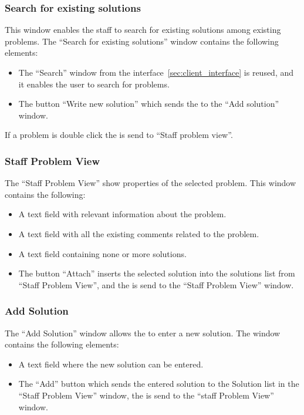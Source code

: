 \subsubsection{Search for existing solutions}
This window enables the staff to search for existing solutions among existing problems. The ``Search for existing solutions'' window contains the following elements:
\begin{itemize}
	\item The ``Search'' window from the \aclient[] interface~\ref{sec:client_interface} is reused, and it enables the user to search for problems.
	\item The button ``Write new solution'' which sends the \astaff to the ``Add solution'' window.
\end{itemize} 
If a problem is double click the \astaff[] is send to ``Staff problem view''.

\subsubsection{Staff Problem View}
The ``Staff Problem View'' show properties of the selected problem. This window contains the following:
\begin{itemize}
	\item A text field with relevant information about the problem.
	\item A text field with all the existing comments related to the problem.
	\item A text field containing none or more solutions.
	\item The button ``Attach'' inserts the selected solution into the solutions list from ``Staff Problem View'', and the \astaff[] is send to the ``Staff Problem View'' window.
\end{itemize}

\subsubsection{Add Solution}
The ``Add Solution'' window allows the \staff[] to enter a new solution. The window contains the following elements:
\begin{itemize}
	\item A text field where the new solution can be entered.
	\item The ``Add'' button which sends the entered solution to the Solution list in the ``Staff Problem View'' window, the \astaff is send to the ``staff Problem View'' window.
\end{itemize}
 

